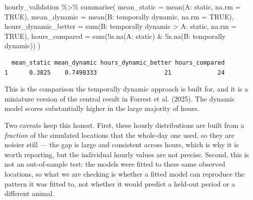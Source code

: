 \documentclass[
  letterpaper,
  DIV=11,
  numbers=noendperiod]{scrartcl}
\newenvironment{Shaded}{\begin{snugshade}}{\end{snugshade}}
\newcommand{\AttributeTok}[1]{\textcolor[rgb]{0.40,0.45,0.13}{#1}}
\newcommand{\ConstantTok}[1]{\textcolor[rgb]{0.56,0.35,0.01}{#1}}
\newcommand{\FunctionTok}[1]{\textcolor[rgb]{0.28,0.35,0.67}{#1}}
\newcommand{\NormalTok}[1]{\textcolor[rgb]{0.00,0.23,0.31}{#1}}
\newcommand{\SpecialCharTok}[1]{\textcolor[rgb]{0.37,0.37,0.37}{#1}}
\newcommand{\StringTok}[1]{\textcolor[rgb]{0.13,0.47,0.30}{#1}}
\begin{document}
\begin{Shaded}
\begin{Highlighting}[]
\NormalTok{hourly\_validation }\SpecialCharTok{\%\textgreater{}\%}
  \FunctionTok{summarise}\NormalTok{(}
    \AttributeTok{mean\_static  =} \FunctionTok{mean}\NormalTok{(}\StringTok{\textasciigrave{}}\AttributeTok{A: static}\StringTok{\textasciigrave{}}\NormalTok{, }\AttributeTok{na.rm =} \ConstantTok{TRUE}\NormalTok{),}
    \AttributeTok{mean\_dynamic =} \FunctionTok{mean}\NormalTok{(}\StringTok{\textasciigrave{}}\AttributeTok{B: temporally dynamic}\StringTok{\textasciigrave{}}\NormalTok{, }\AttributeTok{na.rm =} \ConstantTok{TRUE}\NormalTok{),}
    \AttributeTok{hours\_dynamic\_better =} \FunctionTok{sum}\NormalTok{(}\StringTok{\textasciigrave{}}\AttributeTok{B: temporally dynamic}\StringTok{\textasciigrave{}} \SpecialCharTok{\textgreater{}} \StringTok{\textasciigrave{}}\AttributeTok{A: static}\StringTok{\textasciigrave{}}\NormalTok{, }\AttributeTok{na.rm =} \ConstantTok{TRUE}\NormalTok{),}
    \AttributeTok{hours\_compared =} \FunctionTok{sum}\NormalTok{(}\SpecialCharTok{!}\FunctionTok{is.na}\NormalTok{(}\StringTok{\textasciigrave{}}\AttributeTok{A: static}\StringTok{\textasciigrave{}}\NormalTok{) }\SpecialCharTok{\&} \SpecialCharTok{!}\FunctionTok{is.na}\NormalTok{(}\StringTok{\textasciigrave{}}\AttributeTok{B: temporally dynamic}\StringTok{\textasciigrave{}}\NormalTok{))}
\NormalTok{  )}
\end{Highlighting}
\end{Shaded}

\begin{verbatim}
  mean_static mean_dynamic hours_dynamic_better hours_compared
1      0.3825    0.7498333                   21             24
\end{verbatim}

This is the comparison the temporally dynamic approach is built for, and
it is a miniature version of the central result in Forrest et al.
(2025). The dynamic model scores substantially higher in the large
majority of hours.

Two caveats keep this honest. First, these hourly distributions are
built from a \emph{fraction} of the simulated locations that the
whole-day one used, so they are noisier still --- the gap is large and
consistent across hours, which is why it is worth reporting, but the
individual hourly values are not precise. Second, this is not an
out-of-sample test: the models were fitted to these same observed
locations, so what we are checking is whether a fitted model can
reproduce the pattern it was fitted to, not whether it would predict a
held-out period or a different animal.
\end{document}
